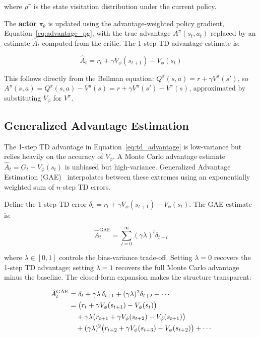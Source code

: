 \documentclass{book}
\begin{document}
where $\rho^\pi$ is the state visitation distribution under the current
policy.

The \textbf{actor} $\pi_\theta$ is updated using the advantage-weighted
policy gradient, Equation~\ref{eq:advantage_pg}, with the true advantage
$A^\pi(s_t, a_t)$ replaced by an estimate $\hat{A}_t$ computed from the
critic. The 1-step TD advantage estimate is:

\begin{equation}
\label{eq:td_advantage}
\hat{A}_t = r_t + \gamma V_\phi(s_{t+1}) - V_\phi(s_t)
\end{equation}

This follows directly from the Bellman equation: $Q^\pi(s, a) = r +
\gamma V^\pi(s')$, so $A^\pi(s, a) = Q^\pi(s,a) - V^\pi(s) = r + \gamma
V^\pi(s') - V^\pi(s)$, approximated by substituting $V_\phi$ for $V^\pi$.

\subsection{Generalized Advantage Estimation}
\label{sec:gae}

The 1-step TD advantage in Equation~\ref{eq:td_advantage} is low-variance
but relies heavily on the accuracy of $V_\phi$. A Monte Carlo advantage
estimate $\hat{A}_t = G_t - V_\phi(s_t)$ is unbiased but high-variance.
Generalized Advantage Estimation (GAE)~\cite{schulman2016high} interpolates
between these extremes using an exponentially weighted sum of $n$-step TD
errors.

Define the 1-step TD error $\delta_t = r_t + \gamma V_\phi(s_{t+1}) -
V_\phi(s_t)$. The GAE estimate is:

\begin{equation}
\label{eq:gae}
\hat{A}_t^{\text{GAE}} = \sum_{l=0}^{\infty} (\gamma\lambda)^l \delta_{t+l}
\end{equation}

where $\lambda \in [0, 1]$ controls the bias-variance trade-off. Setting
$\lambda = 0$ recovers the 1-step TD advantage; setting $\lambda = 1$
recovers the full Monte Carlo advantage minus the baseline. The closed-form
expansion makes the structure transparent:

\begin{align}
\hat{A}_t^{\text{GAE}}
&= \delta_t
 + \gamma\lambda\, \delta_{t+1}
 + (\gamma\lambda)^2 \delta_{t+2} + \cdots \notag \\
&= \bigl(r_t + \gamma V_\phi(s_{t+1}) - V_\phi(s_t)\bigr) \notag \\
&\quad + \gamma\lambda\bigl(r_{t+1} + \gamma V_\phi(s_{t+2})
    - V_\phi(s_{t+1})\bigr) \notag \\
&\quad + (\gamma\lambda)^2\bigl(r_{t+2} + \gamma V_\phi(s_{t+3})
    - V_\phi(s_{t+2})\bigr) + \cdots
\label{eq:gae_expanded}
\end{align}
\end{document}

